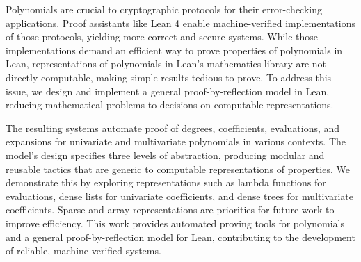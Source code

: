 Polynomials are crucial to cryptographic protocols for their error-checking applications. Proof assistants like Lean 4 enable machine-verified implementations of those protocols, yielding more correct and secure systems. While those implementations demand an efficient way to prove properties of polynomials in Lean, representations of polynomials in Lean’s mathematics library are not directly computable, making simple results tedious to prove. To address this issue, we design and implement a general proof-by-reflection model in Lean, reducing mathematical problems to decisions on computable representations.

The resulting systems automate proof of degrees, coefficients, evaluations, and expansions for univariate and multivariate polynomials in various contexts. The model’s design specifies three levels of abstraction, producing modular and reusable tactics that are generic to computable representations of properties. We demonstrate this by exploring representations such as lambda functions for evaluations, dense lists for univariate coefficients, and dense trees for multivariate coefficients. Sparse and array representations are priorities for future work to improve efficiency. This work provides automated proving tools for polynomials and a general proof-by-reflection model for Lean, contributing to the development of reliable, machine-verified systems.
